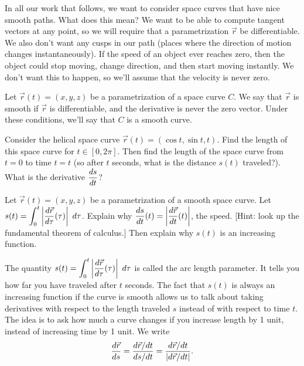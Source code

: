 In all our work that follows, we want to consider space curves that have nice smooth paths.  What does this mean?  We want to be able to compute tangent vectors at any point, so we will require that a parametrization $\vec r$ be differentiable.  We also don't want any cusps in our path (places where the direction of motion changes instantaneously). If the speed of an object ever reaches zero, then the object could stop moving, change direction, and then start moving instantly. We don't want this to happen, so we'll assume that the velocity is never zero.
\begin{definition}
 Let $\vec r(t)=(x,y,z)$ be a parametrization of a space curve $C$. We say that $\vec r$ is smooth if $\vec r$ is differentiable, and the derivative is never the zero vector. Under these conditions, we'll say that $C$ is a smooth curve. 
\end{definition}

\begin{problem}%
%
 Consider the helical space curve $\vec r(t)=(\cos t, \sin t, t)$. Find the length of this space curve for $t\in[0,2\pi]$.  Then find the length of the space curve from $t=0$ to time $t=t$ (so after $t$ seconds, what is the distance $s(t)$ traveled?). What is the derivative $\displaystyle\frac{ds}{dt}$?
\end{problem}

\begin{problem}\label{fundamental theorem of calculus as it applies to arc length parameter}%
 Let $\vec r(t)=(x,y,z)$ be a parametrization of a smooth space curve. Let $\displaystyle s(t)=\int_0^t \left|\frac {d\vec r}{d\tau}(\tau) \right|\ d\tau$.  Explain why $\displaystyle\frac{ds}{dt}(t) = \left|\frac {d\vec r}{dt}(t) \right|$, the speed. [Hint: look up the fundamental theorem of calculus.] Then explain why $s(t)$ is an increasing function.
\end{problem}

The quantity $\displaystyle s(t)=\int_0^t \left|\frac {d\vec r}{d\tau}(\tau) \right|\ d\tau$ is called the arc length parameter.  It tells you how far you have traveled after $t$ seconds.  The fact that $s(t)$ is always an increasing function if the curve is smooth allows us to talk about taking derivatives with respect to the length traveled $s$ instead of with respect to time $t$. The idea is to ask how much a curve changes if you increase length by 1 unit, instead of increasing time by 1 unit.  We write
$$\displaystyle\frac{d\vec r}{ds} =\displaystyle\frac{d\vec r/dt}{ds/dt} = \frac{d\vec r/dt}{|d\vec r/dt|}.$$

